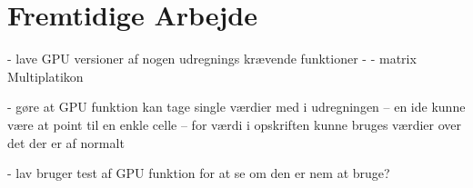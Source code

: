 \section{Fremtidige Arbejde}
- lave GPU versioner af nogen udregnings krævende funktioner
- - matrix Multiplatikon

- gøre at GPU funktion kan tage single værdier med i udregningen
-- en ide kunne være at point til en enkle celle
-- for værdi i opskriften kunne bruges værdier over det der er af normalt

- lav bruger test af GPU funktion for at se om den er nem at bruge?